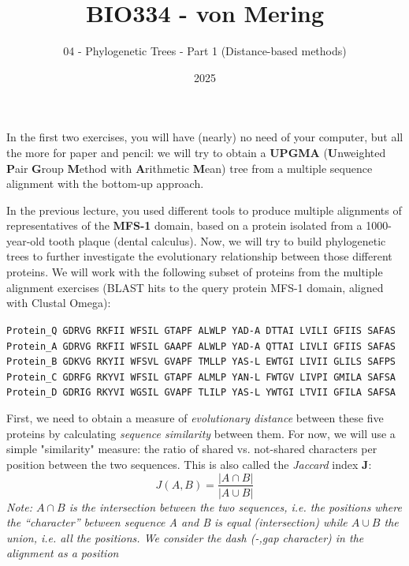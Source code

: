 \documentclass{article}
\title{BIO334 - von Mering}
\author{04 - Phylogenetic Trees - Part 1 (Distance-based methods)}
\date{2025}
\begin{document}
\maketitle
\vspace{-10pt}
\begin{question}[subtitle = Calculating sequence distances from multiple alignments]
    In the first two exercises, you will have (nearly) no need of your computer, but all the more for paper and pencil: we will try to obtain a \textbf{UPGMA} (\textbf{U}nweighted \textbf{P}air \textbf{G}roup \textbf{M}ethod with \textbf{A}rithmetic \textbf{M}ean) tree from a multiple sequence alignment with the bottom-up approach.
    
    In the previous lecture, you used different tools to produce multiple alignments of representatives of the \textbf{MFS-1} domain, based on a protein isolated from a 1000-year-old tooth plaque (dental calculus). Now, we will try to build phylogenetic trees to further investigate the evolutionary relationship between those different proteins. We will work with the following subset of proteins from the multiple alignment exercises (BLAST hits to the query protein MFS-1 domain, aligned with Clustal Omega):
    \begin{codeblock}
        \begin{center}
            \texttt{Protein\_Q  GDRVG RKFII WFSIL GTAPF ALWLP YAD-A DTTAI LVILI GFIIS SAFAS}\\
            \texttt{Protein\_A  GDRVG RKFII WFSIL GAAPF ALWLP YAD-A QTTAI LIVLI GFIIS SAFAS}\\
            \texttt{Protein\_B  GDKVG RKYII WFSVL GVAPF TMLLP YAS-L EWTGI LIVII GLILS SAFPS}\\
            \texttt{Protein\_C  GDRFG RKYVI WFSIL GTAPF ALMLP YAN-L FWTGV LIVPI GMILA SAFSA}\\
            \texttt{Protein\_D  GDRIG RKYVI WGSIL GVAPF TLILP YAS-L YWTGI LTVII GFILA SAFSA} 
        \end{center}
    \end{codeblock}

   First, we need to obtain a measure of \textit{evolutionary distance} between these five proteins by calculating \textit{sequence similarity} between them. For now, we will use a simple "similarity" measure: the ratio of shared vs. not-shared characters per position between the two sequences. This is also called the \textit{Jaccard} index \textbf{J}:
    \begin{equation}
        J(A,B) = \frac{|A\cap B|}{|A\cup B|}
    \end{equation}
    \small{\textit{Note: $A\cap B$ is the intersection between the two sequences, i.e. the positions where the “character” between sequence A and B is equal (intersection) while $A\cup B$ the union, i.e. all the positions. We consider the dash (-,gap character) in the alignment as a position}}


\end{question}
\end{document}
